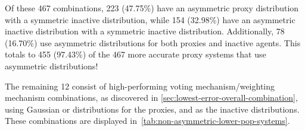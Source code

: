 Of these 467 combinations, 223 (47.75\%) have an asymmetric proxy distribution with
a symmetric inactive distribution, while 154 (32.98\%) have an asymmetric inactive
distribution with a symmetric inactive distribution.
Additionally, 78 (16.70\%) use asymmetric distributions for both proxies and
inactive agents.
This totals to 455 (97.43\%) of the 467 more accurate proxy systems that use
asymmetric distributions!

The remaining 12 consist of high-performing voting mechanism/weighting mechanism
combinations, as discovered in \autoref{sec:lowest-error-overall-combination},
using Gaussian or  distributions for the proxies,
and  as the inactive distributions.
These combinations are displayed in~\autoref{tab:non-asymmetric-lower-pop-systems}.

